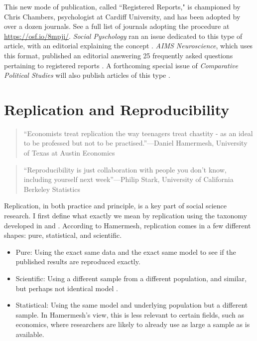 \documentclass[12pt] {article}
\begin{document}
This new mode of publication, called ``Registered Reports," is championed by Chris Chambers, psychologist at Cardiff University, and has been adopted by over a dozen journals. See a full list of journals adopting the procedure at \url{https://osf.io/8mpji/}. \textit{Social Pyschology} ran an issue dedicated to this type of article, with an editorial explaining the concept \citep{nosek2014registered}. \textit{AIMS Neuroscience}, which uses this format, published an editorial answering 25 frequently asked questions pertaining to registered reports \citep{chambers2014instead}. A forthcoming special issue of \textit{Comparative Political Studies} will also publish articles of this type \citep{FindleyCPS}. 

  


\section{Replication and
Reproducibility}\label{replication-and-reproducibility}

\begin{quote}
``Economists treat replication the way teenagers treat chastity - as an
ideal to be professed but not to be practised.''---Daniel Hamermesh,
University of Texas at Austin Economics
\end{quote}

\begin{quote}
``Reproducibility is just collaboration with people you don't know,
including yourself next week''---Philip Stark, University of California Berkeley Statistics
\end{quote}

Replication, in both practice and principle, is a key part of social
science research. I first define what exactly we mean by replication
using the taxonomy developed in \cite{hamermesh_viewpoint:_2007} and \cite{hunter_desperate_2001}.
According to Hamermesh, replication comes in a few different shapes: pure, statistical, and
scientific.

\begin{itemize}
\item
  Pure: Using the exact same data and the exact same model to see if the
  published results are reproduced exactly.
\item
  Scientific: Using a different sample from a different population, and
  similar, but perhaps not identical model .
\item
  Statistical: Using the same model and underlying population but a
  different sample. In Hamermesh's view, this is less relevant to certain fields, such as economics,
  where researchers are likely to already use as large a sample as is available.
\end{itemize}
\end{document}
